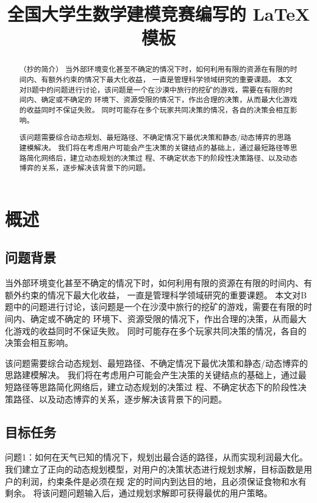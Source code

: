 \documentclass[withoutpreface,bwprint]{cumcmthesis} %
\title{全国大学生数学建模竞赛编写的 \LaTeX{} 模板}
\begin{document}
 \maketitle
 \begin{abstract}
（抄的简介）
    当外部环境变化甚至不确定的情况下时，如何利用有限的资源在有限的时间内、有额外约束的情况下最大化收益，
    一直是管理科学领域研究的重要课题。
    本文对B题中的问题进行讨论，该问题是一个在沙漠中旅行的挖矿的游戏，需要在有限的时间内、确定或不确定的
    环境下、资源受限的情况下，作出合理的决策，从而最大化游戏的收益同时不保证失败。
    同时可能存在多个玩家共同决策的情况，各自的决策会相互影响。
    
    该问题需要综合动态规划、最短路径、不确定情况下最优决策和静态/动态博弈的思路建模解决。
    我们将在考虑用户可能会产生决策的关键结点的基础上，通过最短路径等思路简化网络后，建立动态规划的决策过
    程、不确定状态下的阶段性决策路径、以及动态博弈的关系，逐步解决该背景下的问题。

\end{abstract}


\section{概述}
\subsection{问题背景}
\label{subsec:simulate}

当外部环境变化甚至不确定的情况下时，如何利用有限的资源在有限的时间内、有额外约束的情况下最大化收益，
一直是管理科学领域研究的重要课题。
本文对B题中的问题进行讨论，该问题是一个在沙漠中旅行的挖矿的游戏，需要在有限的时间内、确定或不确定的
环境下、资源受限的情况下，作出合理的决策，从而最大化游戏的收益同时不保证失败。
同时可能存在多个玩家共同决策的情况，各自的决策会相互影响。

该问题需要综合动态规划、最短路径、不确定情况下最优决策和静态/动态博弈的思路建模解决。
我们将在考虑用户可能会产生决策的关键结点的基础上，通过最短路径等思路简化网络后，建立动态规划的决策过
程、不确定状态下的阶段性决策路径、以及动态博弈的关系，逐步解决该背景下的问题。

\subsection{目标任务}

问题1：如何在天气已知的情况下，规划出最合适的路径，从而实现利润最大化。
我们建立了正向的动态规划模型，对用户的决策状态进行规划求解，目标函数是用户的利润，约束条件是必须在规
定的时间内到达目的地，且必须保证食物和水有剩余。
将该问题问题输入后，通过规划求解即可获得最优的用户策略。
\end{document}
